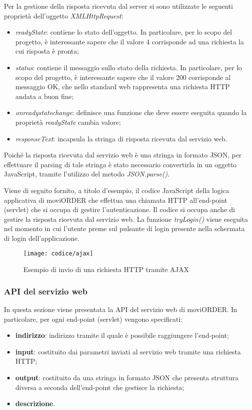 Per la gestione della risposta ricevuta dal server si sono utilizzate le seguenti proprietà dell'oggetto \textit{XMLHttpRequest}:
\begin{itemize}
	\item \textit{readyState}: contiene lo stato dell'oggetto. In particolare, per lo scopo del progetto, è interessante sapere che il valore 4 corrisponde ad una richiesta la cui risposta è pronta;
	\item  \textit{status}: contiene il messaggio sullo stato della richiesta. In particolare, per lo scopo del progetto, è interessante sapere che il valore 200 corrisponde al messaggio OK, che nello standard web rappresenta una richiesta HTTP andata a buon fine;
	\item \textit{onreadystatechange}: definisce una funzione che deve essere eseguita quando la proprietà \textit{readyState} cambia valore;
	\item \textit{responseText}: incapsula la stringa di risposta ricevuta dal servizio web. 
\end{itemize} 
Poiché la risposta ricevuta dal servizio web è una stringa in formato JSON, per effettuare il parsing di tale stringa è stato necessario convertirla in un oggetto JavaScript, tramite l'utilizzo del metodo \textit{JSON.parse()}.

Viene di seguito fornito, a titolo d'esempio, il codice JavaScript della logica applicativa di moviORDER che effettua una chiamata HTTP all'end-point (servlet) che si occupa di gestire l'autenticazione. Il codice si occupa anche di gestire la risposta ricevuta dal servizio web. La funzione \textit{tryLogin()} viene eseguita nel momento in cui l'utente preme sul pulsante di login presente nella schermata di login dell'applicazione.

\newpage

\begin{figure}[!h] 
    \centering 
    \texttt{[image: codice/ajax]} 
    \caption{Esempio di invio di una richiesta HTTP tramite AJAX}
\end{figure}

\subsubsection{API del servizio web} \label{api}

In questa sezione viene presentata la API del servizio web di moviORDER. In particolare, per ogni end-point (servlet) vengono specificati:
\begin{itemize}
	\item \textbf{indirizzo}: indirizzo tramite il quale è possibile raggiungere l'end-point;
	\item \textbf{input}: costituito dai parametri inviati al servizio web tramite una richiesta HTTP;
	\item \textbf{output}: costituito da una stringa in formato JSON che presenta struttura diversa a seconda dell'end-point che gestisce la richiesta;
	\item \textbf{descrizione}.
\end{itemize}

